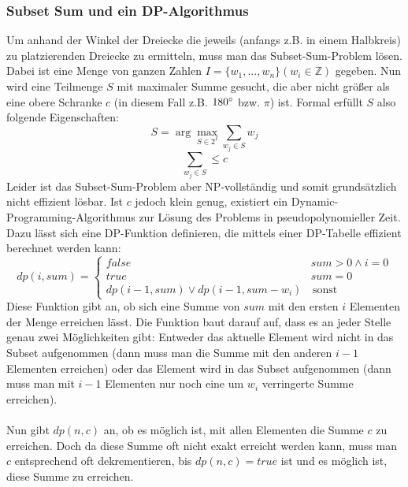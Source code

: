 \documentclass[a4paper, notitlepage, 12pt]{scrartcl}
\begin{document}
  \subsubsection{Subset Sum und ein DP-Algorithmus}
  Um anhand der Winkel der Dreiecke die jeweils (anfangs z.B. in einem Halbkreis) zu platzierenden Dreiecke zu ermitteln, muss man das Subset-Sum-Problem lösen. Dabei ist eine Menge von ganzen Zahlen $I = \{w_1,...,w_n\} (w_i \in \mathbb{Z})$ gegeben. Nun wird eine Teilmenge $S$ mit maximaler Summe gesucht, die aber nicht größer als eine obere Schranke $c$ (in diesem Fall z.B. $180\degree$ bzw. $\pi$) ist. Formal erfüllt $S$ also folgende Eigenschaften:
  \begin{equation}
  S = \arg \max_{S \in 2^I} \sum_{w_j \in S} w_j
  \end{equation}
  \begin{equation}
  \sum_{w_j \in S} \leq c
  \end{equation}
  Leider ist das Subset-Sum-Problem aber NP-vollständig und somit grundsätzlich nicht effizient lösbar. Ist $c$ jedoch klein genug, existiert ein Dynamic-Programming-Algorithmus zur Lösung des Problems in pseudopolynomieller Zeit.\cite{Src:dpsum} Dazu lässt sich eine DP-Funktion definieren, die mittels einer DP-Tabelle effizient berechnet werden kann:
  \begin{equation}
  dp(i,sum) = 
  \begin{cases}
  false & sum > 0 \wedge i = 0 \\
  true & sum = 0 \\
  dp(i-1,sum) \vee dp(i-1,sum-w_i) & \, \text{sonst}
  \end{cases}
  \end{equation}
  Diese Funktion gibt an, ob sich eine Summe von $sum$ mit den ersten $i$ Elementen der Menge erreichen lässt. Die Funktion baut darauf auf, dass es an jeder Stelle genau zwei Möglichkeiten gibt: Entweder das aktuelle Element wird nicht in das Subset aufgenommen (dann muss man die Summe mit den anderen $i-1$ Elementen erreichen) oder das Element wird in das Subset aufgenommen (dann muss man mit $i-1$ Elementen nur noch eine um $w_i$ verringerte Summe erreichen). \\ \\
  Nun gibt $dp(n,c)$ an, ob es möglich ist, mit allen Elementen die Summe $c$ zu erreichen. Doch da diese Summe oft nicht exakt erreicht werden kann, muss man $c$ entsprechend oft dekrementieren, bis $dp(n,c) = true$ ist und es möglich ist, diese Summe zu erreichen. \\ \\
\end{document}
